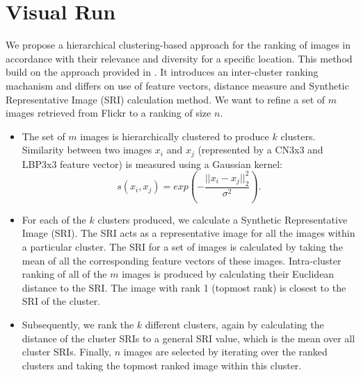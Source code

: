 \documentclass{acm_proc_article-me11_tweaked}
\begin{document}
\section{Visual Run}
\label{visual-similarity}
We propose a hierarchical clustering-based approach for the ranking of images in accordance with their relevance and diversity for a specific location. 
This method build on the approach provided in \cite{representativeness}. It introduces an inter-cluster ranking machanism and  differs on use of feature vectors, distance measure and Synthetic Representative Image (SRI) calculation method.
We want to refine a set of $m$ images retrieved from Flickr to a ranking of size $n$.
\begin{itemize}[leftmargin=*]
 \item The set of $m$ images is hierarchically clustered to produce $k$ clusters. Similarity between two images $x_i$ and $x_j$ (represented by a CN3x3 and LBP3x3 feature vector) is measured using a Gaussian kernel:
 \begin{equation}
 \label{gaussian-similarity}
s(x_i, x_j) = exp\left(-\frac{||x_i - x_j||_2^2}{\sigma^2}\right).
 \end{equation}
 
 \item For each of the $k$ clusters produced, we calculate a Synthetic Representative Image (SRI). 
The SRI acts as a representative image for all the images within a particular cluster. 
The SRI for a set of images is calculated by taking the mean of all the corresponding feature vectors of these images. 
Intra-cluster ranking of all of the $m$ images is produced by calculating their Euclidean distance to the SRI.
The image with rank 1 (topmost rank) is closest to the SRI of the cluster.
\item Subsequently, we rank the $k$ different clusters, again by calculating the distance of the cluster SRIs to a general SRI value, which is the mean over all cluster SRIs. 
Finally, $n$ images are selected by iterating over the ranked clusters and taking the topmost ranked image within this cluster. 

\end{itemize}
\end{document}
